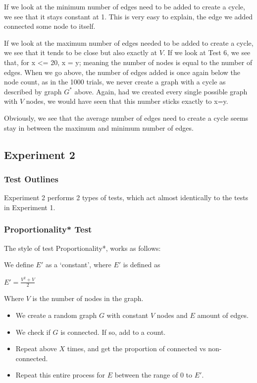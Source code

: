 \documentclass[12pt]{article}
\begin{document}
If we look at the minimum number of edges need to be added to create a cycle, we see that it stays constant at 1. This is very easy to explain, the edge we added connected some node to itself.

If we look at the maximum number of edges needed to be added to create a cycle, we see that it tends to be close but also exactly at $V$. If we look at Test 6, we see that, for x <= 20, x = y; meaning the number of nodes is equal to the number of edges. When we go above, the number of edges added is once again below the node count, as in the 1000 trials, we never create a graph with a cycle as described by graph $G^{*}$ above. Again, had we created every single possible graph with $V$ nodes, we would have seen that this number sticks exactly to x=y.

Obviously, we see that the average number of edges need to create a cycle seems stay in between the maximum and minimum number of edges.

%
%
%
%
\newpage
\subsection{Experiment 2}


\subsubsection{Test Outlines}

Experiment 2 performs 2 types of tests, which act almost identically to the tests in Experiment 1.

\subsubsection*{Proportionality* Test}
The style of test Proportionality*, works as follows:

We define $E'$ as a `constant', where $E'$ is defined as
\begin{center}
    $E' = \frac{V^2 + V}{2}$
\end{center}

Where $V$ is the number of nodes in the graph.

\begin{itemize}
    \item We create a random graph $G$ with constant $V$ nodes and $E$ amount of edges.
    \item We check if $G$ is connected. If so, add to a count.
    \item Repeat above $X$ times, and get the proportion of connected vs non-connected.
    \item Repeat this entire process for $E$ between the range of 0 to $E'$.
\end{itemize}
\end{document}
